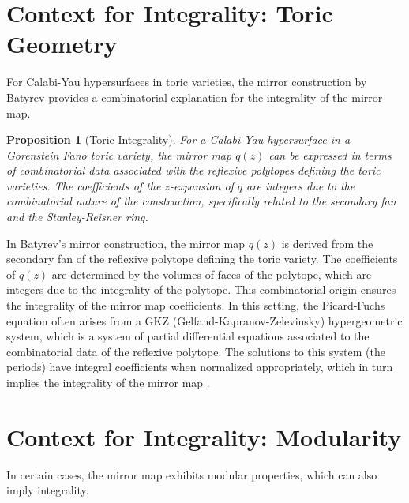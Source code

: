 \documentclass{book}
\newcommand{\qexp}{q} %
\newcommand{\zmod}{z} %
\newtheorem{proposition}[theorem]{Proposition}
\theoremstyle{definition}
\begin{document}
\section{Context for Integrality: Toric Geometry}
For Calabi-Yau hypersurfaces in toric varieties, the mirror construction by Batyrev \cite{Batyrev1994} provides a combinatorial explanation for the integrality of the mirror map.

\begin{proposition}[Toric Integrality]
\label{prop:toric_integrality}
For a Calabi-Yau hypersurface in a Gorenstein Fano toric variety, the mirror map $\qexp(\zmod)$ can be expressed in terms of combinatorial data associated with the reflexive polytopes defining the toric varieties. The coefficients of the $\zmod$-expansion of $\qexp$ are integers due to the combinatorial nature of the construction, specifically related to the secondary fan and the Stanley-Reisner ring.
\end{proposition}
In Batyrev's mirror construction, the mirror map $\qexp(\zmod)$ is derived from the secondary fan of the reflexive polytope defining the toric variety. The coefficients of $\qexp(\zmod)$ are determined by the volumes of faces of the polytope, which are integers due to the integrality of the polytope. This combinatorial origin ensures the integrality of the mirror map coefficients. In this setting, the Picard-Fuchs equation often arises from a GKZ (Gelfand-Kapranov-Zelevinsky) hypergeometric system, which is a system of partial differential equations associated to the combinatorial data of the reflexive polytope. The solutions to this system (the periods) have integral coefficients when normalized appropriately, which in turn implies the integrality of the mirror map \cite{LianYau1997, Batyrev1994}.

\section{Context for Integrality: Modularity}
\label{sec:modularity_integrality}
In certain cases, the mirror map exhibits modular properties, which can also imply integrality.
\end{document}
